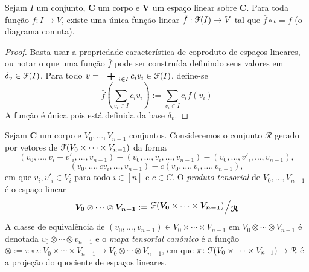 \begin{proposition}
Sejam $I$ um conjunto, $\bm C$ um corpo e $\bm V$ um espaço linear sobre $\bm C$. Para toda função $f: I \to V$, existe uma única função linear $\bar f: \mathcal{F}(I) \to V$ tal que $\bar f \circ \iota = f$ (o diagrama comuta).
\begin{figure}
\centering
{}
\end{figure}
\end{proposition}
\begin{proof} Basta usar a propriedade característica de coproduto de espaços lineares, ou notar o que uma função $\bar f$ pode ser construída definindo seus valores em $\delta_v \in \mathcal{F}(I)$. Para todo $v=\sum_{i \in I} c_i v_i \in \liv(I)$, define-se
	\begin{equation*}
	\bar f\left(\sum_{v_i \in I} c_i v_i\right):= \sum_{v_i \in I} c_i f(v_i)
	\end{equation*}
A função é única pois está definida da base $\delta_v$.
\end{proof}

\begin{definition}
Sejam $\bm C$ um corpo e $V_0,\ldots,V_{n-1}$ conjuntos. Consideremos o conjunto $\mathcal R$ gerado por vetores de $\mathcal{F}(V_0 \times \cdots \times V_{n-1})$ da forma
	\begin{equation*}
	(v_0,\ldots,v_i+v'_i,\ldots,v_{n-1}) - (v_0,\ldots,v_i,\ldots,v_{n-1}) - (v_0,\ldots,v'_i,\ldots,v_{n-1}),
	\end{equation*}
	\begin{equation*}
	(v_0,\ldots,cv_i,\ldots,v_{n-1}) - c(v_0,\ldots,v_i,\ldots,v_{n-1}),
	\end{equation*}
em que $v_i,v'_i \in V_i$ para todo $i \in [n]$ e $c \in C$. O \emph{produto tensorial} de $V_0,\ldots,V_{n-1}$ é o espaço linear
	\begin{equation*}
	\bm{V_0} \otimes \cdots \otimes \bm{V_{n-1}} := \quo{\liv(\bm{V_0} \times \cdots \times \bm{V_{n-1}})}{\bm{\mathcal R}}
	\end{equation*}
A classe de equivalência de $(v_0,\ldots,v_{n-1}) \in V_0 \times \cdots \times V_{n-1}$ em $V_0 \otimes \cdots \otimes V_{n-1}$ é denotada $v_0 \otimes \cdots \otimes v_{n-1}$ e o \emph{mapa tensorial canônico} é a função $\otimes := \pi \circ \iota\colon V_0 \times \cdots \times V_{n-1} \to  V_0 \otimes \cdots \otimes V_{n-1}$, em que $\pi\colon \mathcal{F}(V_0 \times \cdots \times V_{n-1}) \to \mathcal R$ é a projeção do quociente de espaços lineares.
\end{definition}

